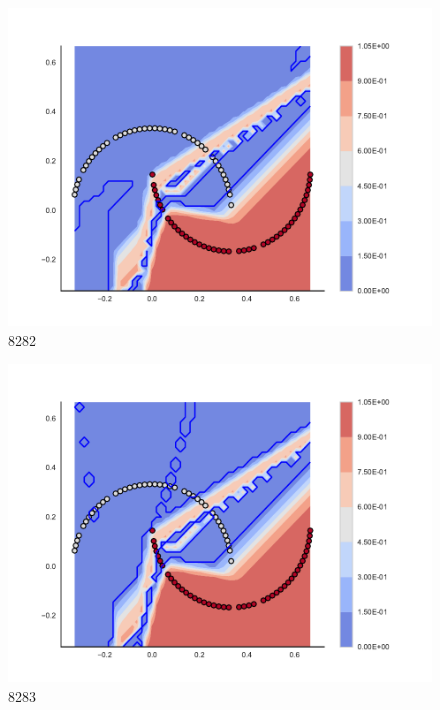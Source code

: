 \begin{subfigure}[b]{0.09\textwidth}
    \includegraphics[clip, trim=2.35cm 1.75cm 4.5cm 0cm,width=\textwidth]{img/convergence/8282.pdf}
    \caption{8282}
    \label{fig:convergence_8282}
\end{subfigure}
%
\begin{subfigure}[b]{0.09\textwidth}
    \includegraphics[clip, trim=2.35cm 1.75cm 4.5cm 0cm,width=\textwidth]{img/convergence/8283.pdf}
    \caption{8283}
    \label{fig:convergence_8283}
\end{subfigure}
%
